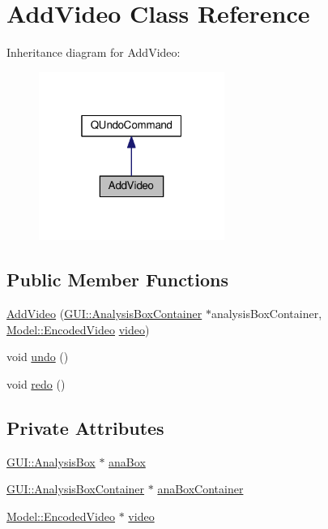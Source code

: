 \hypertarget{classUndoRedo_1_1AddVideo}{}\section{Add\+Video Class Reference}
\label{classUndoRedo_1_1AddVideo}


Inheritance diagram for Add\+Video\+:
\nopagebreak
\begin{figure}[H]
\begin{center}
\leavevmode
\includegraphics[width=172pt]{classUndoRedo_1_1AddVideo__inherit__graph}
\end{center}
\end{figure}
\subsection*{Public Member Functions}
\begin{DoxyCompactItemize}
\item 
\hyperlink{classUndoRedo_1_1AddVideo_a3725967509af3a267046289fec1c8ad2}{Add\+Video} (\hyperlink{classGUI_1_1AnalysisBoxContainer}{G\+U\+I\+::\+Analysis\+Box\+Container} $\ast$analysis\+Box\+Container, \hyperlink{classModel_1_1EncodedVideo}{Model\+::\+Encoded\+Video} \hyperlink{classUndoRedo_1_1AddVideo_a226620d1252c162814ca98d3e522255c}{video})
\item 
void \hyperlink{classUndoRedo_1_1AddVideo_a0e1e7804a53f6d62efc72c9bdbec8571}{undo} ()
\item 
void \hyperlink{classUndoRedo_1_1AddVideo_a93c48d6ed036e1a381be53ac67643284}{redo} ()
\end{DoxyCompactItemize}
\subsection*{Private Attributes}
\begin{DoxyCompactItemize}
\item 
\hyperlink{classGUI_1_1AnalysisBox}{G\+U\+I\+::\+Analysis\+Box} $\ast$ \hyperlink{classUndoRedo_1_1AddVideo_a574e9e2f540b9068b64a7f26cb40b20a}{ana\+Box}
\item 
\hyperlink{classGUI_1_1AnalysisBoxContainer}{G\+U\+I\+::\+Analysis\+Box\+Container} $\ast$ \hyperlink{classUndoRedo_1_1AddVideo_a69c99d1253a1b743455a030de5a733cb}{ana\+Box\+Container}
\item 
\hyperlink{classModel_1_1EncodedVideo}{Model\+::\+Encoded\+Video} $\ast$ \hyperlink{classUndoRedo_1_1AddVideo_a226620d1252c162814ca98d3e522255c}{video}
\end{DoxyCompactItemize}


